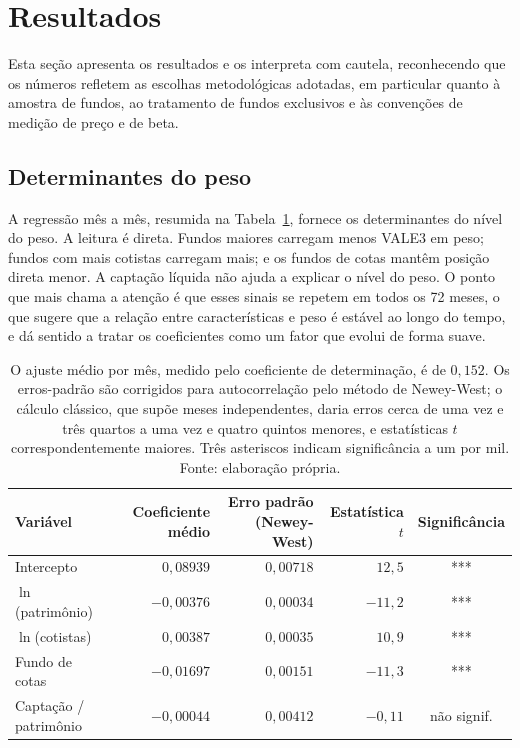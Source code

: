 \documentclass[12pt,a4paper]{article}
\begin{document}
\section{Resultados}

Esta seção apresenta os resultados e os interpreta com cautela, reconhecendo que os números
refletem as escolhas metodológicas adotadas, em particular quanto à amostra de fundos, ao
tratamento de fundos exclusivos e às convenções de medição de preço e de beta.

\subsection{Determinantes do peso}

A regressão mês a mês, resumida na Tabela~\ref{tab:fm}, fornece os determinantes do nível do
peso. A leitura é direta. Fundos maiores carregam menos VALE3 em peso; fundos com mais
cotistas carregam mais; e os fundos de cotas mantêm posição direta menor. A captação líquida
não ajuda a explicar o nível do peso. O ponto que mais chama a atenção é que esses sinais se
repetem em todos os 72 meses, o que sugere que a relação entre características e peso é estável
ao longo do tempo, e dá sentido a tratar os coeficientes como um fator que evolui de forma
suave.

\begin{table}[h]\centering\small
\caption{Regressão do peso mês a mês, resumo no estilo Fama--MacBeth (72 meses), com erros-padrão
corrigidos para autocorrelação.}
\label{tab:fm}
\begin{tabular}{@{}lrrrc@{}}
\toprule
Variável & Coeficiente médio & Erro padrão (Newey-West) & Estatística $t$ & Significância \\
\midrule
Intercepto              & $0{,}08939$  & $0{,}00718$ & $12{,}5$  & *** \\
$\ln$(patrimônio)       & $-0{,}00376$ & $0{,}00034$ & $-11{,}2$ & *** \\
$\ln$(cotistas)         & $0{,}00387$  & $0{,}00035$ & $10{,}9$  & *** \\
Fundo de cotas          & $-0{,}01697$ & $0{,}00151$ & $-11{,}3$ & *** \\
Captação / patrimônio   & $-0{,}00044$ & $0{,}00412$ & $-0{,}11$ & não signif. \\
\bottomrule
\end{tabular}
\caption*{\footnotesize O ajuste médio por mês, medido pelo coeficiente de determinação, é de
$0{,}152$. Os erros-padrão são corrigidos para autocorrelação pelo método de Newey-West; o
cálculo clássico, que supõe meses independentes, daria erros cerca de uma vez e três quartos a
uma vez e quatro quintos menores, e estatísticas $t$ correspondentemente maiores. Três asteriscos
indicam significância a um por mil. Fonte: elaboração própria.}
\end{table}
\end{document}
